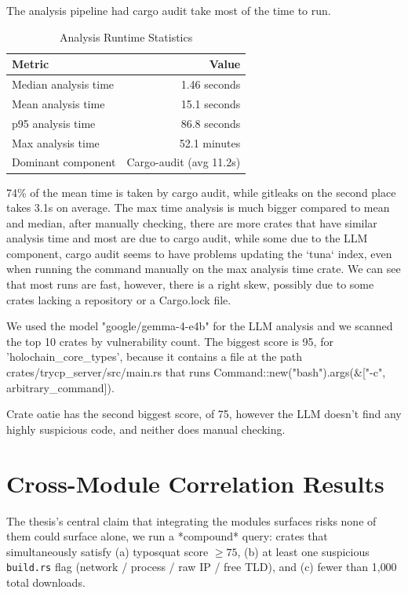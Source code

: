 The analysis pipeline had cargo audit take most of the time to run.

\begin{table}[h]
\centering
\begin{tabular}{|l|r|}
\hline
\textbf{Metric} & \textbf{Value} \\ \hline
Median analysis time & 1.46 seconds \\ \hline
Mean analysis time & 15.1 seconds \\ \hline
p95 analysis time & 86.8 seconds \\ \hline
Max analysis time & 52.1 minutes \\ \hline
Dominant component & Cargo-audit (avg 11.2s) \\ \hline
\end{tabular}
\caption{Analysis Runtime Statistics}
\label{tab:analysis-runtime}
\end{table}

74\% of the mean time is taken by cargo audit, while gitleaks on the second place takes 3.1s on average. The max time analysis is much bigger compared to mean and median, after manually checking, there are more crates that have similar analysis time and most are due to cargo audit, while some due to the LLM component, cargo audit seems to have problems updating the `tuna` index, even when running the command manually on the max analysis time crate.
We can see that most runs are fast, however, there is a right skew, possibly due to some crates lacking a repository or a Cargo.lock file.

We used the model "google/gemma-4-e4b" for the LLM analysis and we scanned the top 10 crates by vulnerability count.
The biggest score is 95, for 'holochain\_core\_types', because it contains a file at the path crates/trycp\_server/src/main.rs that runs Command::new("bash").args(\&["-c", arbitrary\_command]).

Crate oatie has the second biggest score, of 75, however the LLM doesn't find any highly suspicious code, and neither does manual checking.

\section{Cross-Module Correlation Results}\label{sect:cross-module}

The thesis's central claim that integrating the modules surfaces risks none of them could surface alone, we run a *compound* query: crates that simultaneously satisfy
(a) typosquat score $\geq 75$,
(b) at least one suspicious \texttt{build.rs} flag (network / process / raw IP / free TLD), and
(c) fewer than 1{,}000 total downloads.


